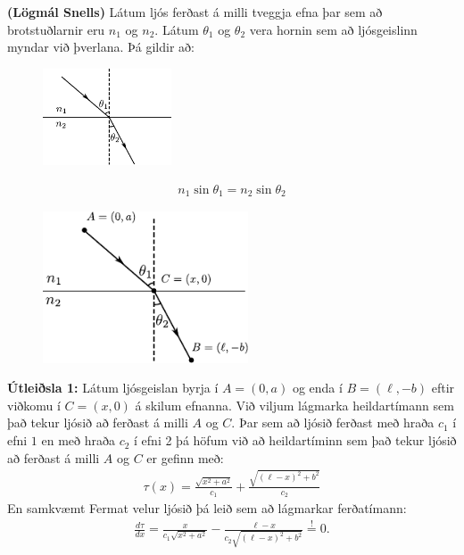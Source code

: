 \begin{tcolorbox}
\begin{theorem} \textbf{(Lögmál Snells)} Látum ljós ferðast á milli tveggja efna þar sem að brotstuðlarnir eru $n_1$ og $n_2$. Látum $\theta_1$ og $\theta_2$ vera hornin sem að ljósgeislinn myndar við þverlana. Þá gildir að:
\begin{minipage}{\linewidth}
\begin{figure}
\includegraphics[width = 1.5in]{figures/snell1.pdf}
\end{figure}
\begin{align*}
    n_1 \sin\theta_1 = n_2 \sin\theta_2
\end{align*}
\vspace{1.4cm}
\end{minipage}
\end{theorem}
\end{tcolorbox}


\begin{minipage}{\linewidth}
\begin{figure}
\includegraphics[width = 2.4in]{figures/snell2.pdf}
\end{figure}

\textbf{Útleiðsla 1:} Látum ljósgeislan byrja í $A = (0,a)$ og enda í $B = (\ell, -b)$ eftir viðkomu í $C = (x,0)$ á skilum efnanna. Við viljum lágmarka heildartímann sem það tekur ljósið að ferðast á milli $A$ og $C$. Þar sem að ljósið ferðast með hraða $c_1$ í efni $1$ en með hraða $c_2$ í efni 2 þá höfum við að heildartíminn sem það tekur ljósið að ferðast á milli $A$ og $C$ er gefinn með:
\begin{align*}
    \tau(x) = \frac{\sqrt{x^2+a^2}}{c_1} + \frac{\sqrt{\left( \ell - x \right)^2 + b^2}}{c_2}
\end{align*}
En samkvæmt Fermat velur ljósið þá leið sem að lágmarkar ferðatímann:
\begin{align*}
    \frac{d\tau}{dx} = \frac{x}{c_1\sqrt{x^2+a^2}} - \frac{\ell-x}{c_2 \sqrt{(\ell-x)^2+b^2}} \stackrel{!}{=} 0.
\end{align*}
\end{minipage}

